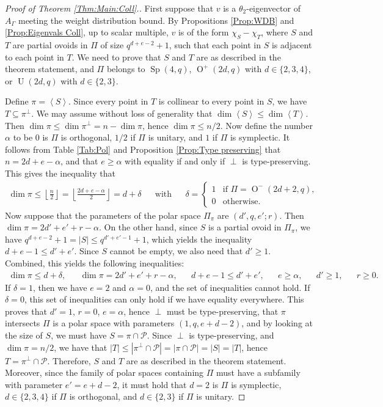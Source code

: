 \documentclass[a4paper]{article}
\theoremstyle{definition}
\renewcommand{\leq}{\leqslant}
\renewcommand{\geq}{\geqslant}
\newcommand{\vspan}[1]{\left\langle #1 \right\rangle}
\newcommand{\floor}[1]{\left \lfloor #1 \right \rfloor}
\renewcommand{\mp}{\mathcal P}
\DeclareMathOperator{\Sp}{Sp}
\DeclareMathOperator{\OO}{O}
\DeclareMathOperator{\U}{U}
\begin{document}
\begin{proof}[Proof of Theorem \ref{Thm:Main:Coll}.]
First suppose that $v$ is a $\theta_2$-eigenvector of $A_\Gamma$ meeting the weight distribution bound.
By Propositions \ref{Prop:WDB} and \ref{Prop:Eigenvals Coll}, up to scalar multiple, $v$ is of the form $\chi_S - \chi_T$, where $S$ and $T$ are partial ovoids in $\Pi$ of size $q^{d+e-2}+1$, such that each point in $S$ is adjacent to each point in $T$.
We need to prove that $S$ and $T$ are as described in the theorem statement, and $\Pi$ belongs to $\Sp(4,q)$, $\OO^+(2d,q)$ with $d \in \{2,3,4\}$, or $\U(2d,q)$ with $d \in \{2,3\}$.

Define $\pi = \vspan S$.
Since every point in $T$ is collinear to every point in $S$, we have $T \subseteq \pi^\perp$.
We may assume without loss of generality that $\dim \vspan S \leq \dim \vspan T$.
Then $\dim \pi \leq \dim \pi^\perp = n -\dim \pi$, hence $\dim \pi \leq n/2$.
Now define the number $\alpha$ to be $0$ is $\Pi$ is orthogonal, $1/2$ if $\Pi$ is unitary, and $1$ if $\Pi$ is symplectic.
It follows from Table \ref{Tab:Pol} and Proposition \ref{Prop:Type preserving} that $n = 2d+e-\alpha$, and that $e \geq \alpha$ with equality if and only if $\perp$ is type-preserving.
This gives the inequality that
\begin{align*}
 \dim \pi \leq \floor{\frac n2} =  \floor{\frac{2d+e-\alpha}{2}} = d + \delta
 && \text{with} &&
 \delta = \begin{cases}
  1 & \text{if } \Pi = \OO^-(2d+2,q), \\
  0 & \text{otherwise}.
 \end{cases}
\end{align*}
Now suppose that the parameters of the polar space $\Pi_\pi$ are $(d',q,e';r)$.
Then $\dim \pi = 2d' + e' + r -\alpha$.
On the other hand, since $S$ is a partial ovoid in $\Pi_\pi$, we have $q^{d+e-2}+1 = |S| \leq q^{d'+e'-1}+1$, which yields the inequality $d+e-1 \leq d'+e'$.
Since $S$ cannot be empty, we also need that $d' \geq 1$.
Combined, this yields the following inequalities:
\begin{align*}
 \dim \pi \leq d + \delta, &&
 \dim \pi = 2d'+e'+r-\alpha, &&
 d+e-1 \leq d'+e', &&
 e \geq \alpha, &&
 d' \geq 1, &&
 r \geq 0.
\end{align*}
If $\delta = 1$, then we have $e=2$ and $\alpha=0$, and the set of inequalities cannot hold.
If $\delta=0$, this set of inequalities can only hold if we have equality everywhere.
This proves that $d'=1$, $r=0$, $e=\alpha$, hence $\perp$ must be type-preserving, that $\pi$ intersects $\Pi$ is a polar space with parameters $(1,q,e+d-2)$, and by looking at the size of $S$, we must have $S = \pi \cap \mp$.
Since $\perp$ is type-preserving, and $\dim \pi = n/2$, we have that $|T| \leq |\pi^\perp \cap \mp| = |\pi \cap \mp| = |S| = |T|$, hence $T = \pi^\perp \cap \mp$.
Therefore, $S$ and $T$ are as described in the theorem statement.
Moreover, since the family of polar spaces containing $\Pi$ must have a subfamily with parameter $e' = e+d-2$, it must hold that $d=2$ is $\Pi$ is symplectic, $d \in \{2,3,4\}$ if $\Pi$ is orthogonal, and $d \in \{2,3\}$ if $\Pi$ is unitary.


\end{proof}
\end{document}
